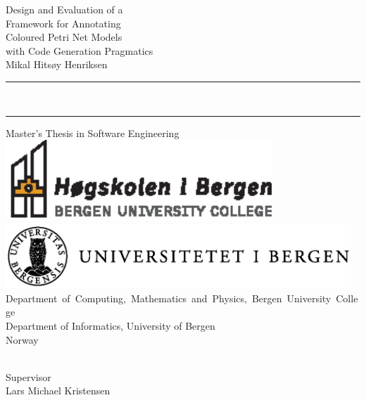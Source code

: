 
\vspace*{\fill}
\begin{flushright}
  {\Huge\sf Design and Evaluation of a}\\[2ex]
  {\Huge\sf Framework for Annotating}\\[2ex]
  {\Huge\sf Coloured Petri Net Models}\\[2ex]
  {\Huge\sf with Code Generation Pragmatics}\\[4ex]
  {\huge\sf Mikal Hitsøy Henriksen} 
\end{flushright}
\noindent\rule{\linewidth}{1mm}\\[-.5ex]
\noindent\rule{\linewidth}{2.5mm}
\vfill
\begin{center}
  {\huge\sf Master's Thesis in Software Engineering}\\[\fill]
  \includegraphics[width=10cm]{HiB_english.eps}\hspace{15mm}
  \includegraphics[width=13cm]{UiBlogo_graysc_v_V8.eps}\\[\fill]
  {\sf \mbox{Department of Computing, Mathematics and Physics, Bergen University College} \\
  Department of Informatics, University of Bergen\\
  Norway}
\end{center}
\begin{center}
  {\sf \makeatletter\@date\makeatother\\Supervisor\\Lars Michael Kristensen}
\end{center}
\vspace*{\fill}